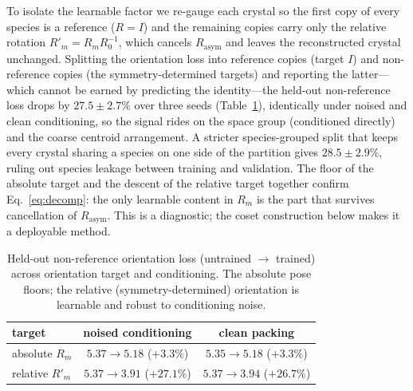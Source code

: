 \documentclass[journal=jcisd8,manuscript=article]{achemso}
\begin{document}
To isolate the learnable factor we re-gauge each crystal so the first copy of every
species is a reference ($R=I$) and the remaining copies carry only the relative
rotation $R'_m=R_mR_0^{-1}$, which cancels $R_{\text{asym}}$ and leaves the
reconstructed crystal unchanged. Splitting the orientation loss into reference
copies (target $I$) and non-reference copies (the symmetry-determined targets) and
reporting the latter---which cannot be earned by predicting the identity---the
held-out non-reference loss drops by $27.5\pm2.7\%$ over three seeds
(Table~\ref{tab:twobytwo}), identically under noised and clean conditioning, so the
signal rides on the space group (conditioned directly) and the coarse centroid
arrangement. A stricter species-grouped split that keeps every crystal sharing a
species on one side of the partition gives $28.5\pm2.9\%$, ruling out species
leakage between training and validation. The floor of the absolute target and the
descent of the relative target together confirm Eq.~\eqref{eq:decomp}: the only
learnable content in $R_m$ is the part that survives cancellation of
$R_{\text{asym}}$. This is a diagnostic; the coset construction below makes it a
deployable method.

\begin{table}[t]\centering
\caption{Held-out non-reference orientation loss (untrained $\rightarrow$ trained)
across orientation target and conditioning. The absolute pose floors; the relative
(symmetry-determined) orientation is learnable and robust to conditioning noise.}
\label{tab:twobytwo}
\begin{tabular}{lcc}\toprule
target & noised conditioning & clean packing \\\midrule
absolute $R_m$  & $5.37\!\rightarrow\!5.18$ ($+3.3\%$) & $5.35\!\rightarrow\!5.18$ ($+3.3\%$) \\
relative $R'_m$ & $5.37\!\rightarrow\!3.91$ ($+27.1\%$) & $5.37\!\rightarrow\!3.94$ ($+26.7\%$) \\
\bottomrule
\end{tabular}
\end{table}
\end{document}
